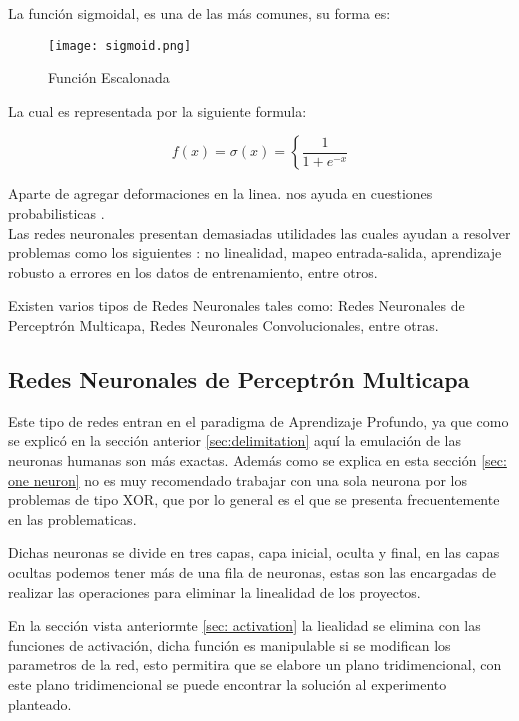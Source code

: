                 La funci\'on sigmoidal, es una de las m\'as comunes, su forma es: 

                \begin{figure}[H]
                    \centering
                    \texttt{[image: sigmoid.png]}
                    \caption{Funci\'on Escalonada}
                    \label{fig:fig5}
                \end{figure}

                La cual es representada por la siguiente formula:

                \[f(x) = \sigma(x) =  \left\{ \frac{1}{1 + e^{-x}} \right. \]

                Aparte de agregar deformaciones en la linea. nos ayuda en cuestiones probabilisticas \cite{Freire2021}.\\


        Las redes neuronales presentan demasiadas utilidades las cuales ayudan a  resolver problemas como los 
        siguientes \cite{liu2015}: no linealidad, mapeo entrada-salida, aprendizaje robusto 
        a errores en los datos de entrenamiento, entre otros.

        Existen varios tipos de Redes Neuronales tales como: Redes Neuronales de Perceptr\'on 
        Multicapa, Redes Neuronales Convolucionales, entre otras.
    
        \subsection{Redes Neuronales de Perceptr\'on Multicapa}
            Este tipo de redes entran en el paradigma de Aprendizaje Profundo, ya que como se explic\'o en 
            la secci\'on anterior \eqref{sec:delimitation} aqu\'i la emulaci\'on de las neuronas humanas son m\'as 
            exactas.
            Adem\'as como se explica en esta sección \eqref{sec: one neuron} no es muy recomendado trabajar con una sola 
            neurona por los problemas de tipo XOR, que por lo general es el que se presenta frecuentemente en las problematicas.

            Dichas neuronas se divide en tres capas, capa inicial, oculta y final, en las capas ocultas podemos
            tener m\'as de una fila de neuronas, estas son las encargadas de realizar las operaciones para eliminar 
            la linealidad de los proyectos. 

            En la secci\'on vista anteriormte \eqref{sec: activation} la liealidad se elimina con las funciones de activaci\'on, dicha funci\'on 
            es manipulable si se modifican los parametros de la red, esto permitira que se elabore un plano tridimencional, con este plano tridimencional
            se puede encontrar la soluci\'on al experimento planteado.
            
